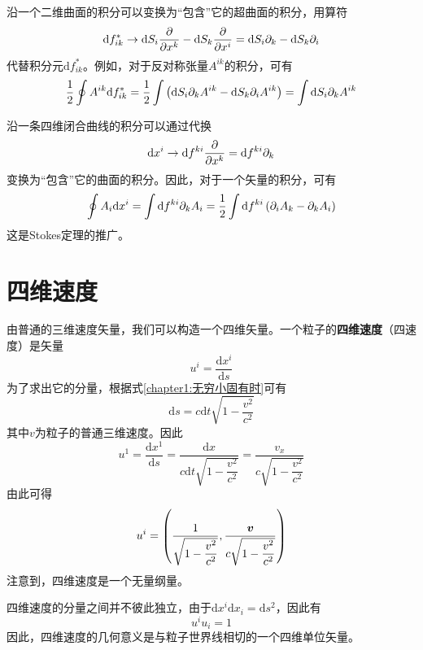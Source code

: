沿一个二维曲面的积分可以变换为“包含”它的超曲面的积分，用算符
\begin{equation}
	\mathrm{d}f^*_{ik} \to \mathrm{d}S_i \frac{\partial}{\partial x^k} - \mathrm{d}S_k \frac{\partial}{\partial x^i} = \mathrm{d}S_i \partial_k - \mathrm{d}S_k \partial_i
\end{equation}
代替积分元$\mathrm{d}f^*_{ik}$。例如，对于反对称张量$A^{ik}$的积分，可有
\begin{equation}
	\frac12 \oint A^{ik}\mathrm{d}f^*_{ik} = \frac12 \int \left(\mathrm{d}S_i \partial_kA^{ik} - \mathrm{d}S_k \partial_iA^{ik}\right) = \int \mathrm{d}S_i \partial_kA^{ik}
\end{equation}

沿一条四维闭合曲线的积分可以通过代换
\begin{equation}
	\mathrm{d}x^i \to \mathrm{d}f^{ki}\frac{\partial}{\partial x^k} = \mathrm{d}f^{ki} \partial_k
\end{equation}
变换为“包含”它的曲面的积分。因此，对于一个矢量的积分，可有
\begin{equation}
	\oint A_i \mathrm{d}x^i = \int \mathrm{d}f^{ki}\partial_kA_i = \frac12 \int \mathrm{d}f^{ki} \left(\partial_iA_k - \partial_kA_i\right)
\end{equation}
这是Stokes定理的推广。

\section{四维速度}

由普通的三维速度矢量，我们可以构造一个四维矢量。一个粒子的{\bf 四维速度}（四速度）是矢量
\begin{equation}
	u^i = \frac{\mathrm{d} x^i}{\mathrm{d} s}
\end{equation}
为了求出它的分量，根据式\eqref{chapter1:无穷小固有时}可有
\begin{equation}
	\mathrm{d}s = c\mathrm{d}t\sqrt{1-\frac{v^2}{c^2}}
\end{equation}
其中$v$为粒子的普通三维速度。因此
\begin{equation*}
	u^1 = \frac{\mathrm{d}x^1}{\mathrm{d}s} = \frac{\mathrm{d}x}{c\mathrm{d}t\sqrt{1-\dfrac{v^2}{c^2}}} = \frac{v_x}{c \sqrt{1-\dfrac{v^2}{c^2}}}
\end{equation*}
由此可得
\begin{equation}
	u^i = \left(\frac{1}{\sqrt{1-\dfrac{v^2}{c^2}}},\frac{\boldsymbol{v}}{c\sqrt{1-\dfrac{v^2}{c^2}}}\right)
\end{equation}
注意到，四维速度是一个无量纲量。

四维速度的分量之间并不彼此独立，由于$\mathrm{d}x^i\mathrm{d}x_i = \mathrm{d}s^2$，因此有
\begin{equation}
	u^iu_i = 1
	\label{chapter1:四维速度分量之间的关系}
\end{equation}
因此，四维速度的几何意义是与粒子世界线相切的一个四维单位矢量。

